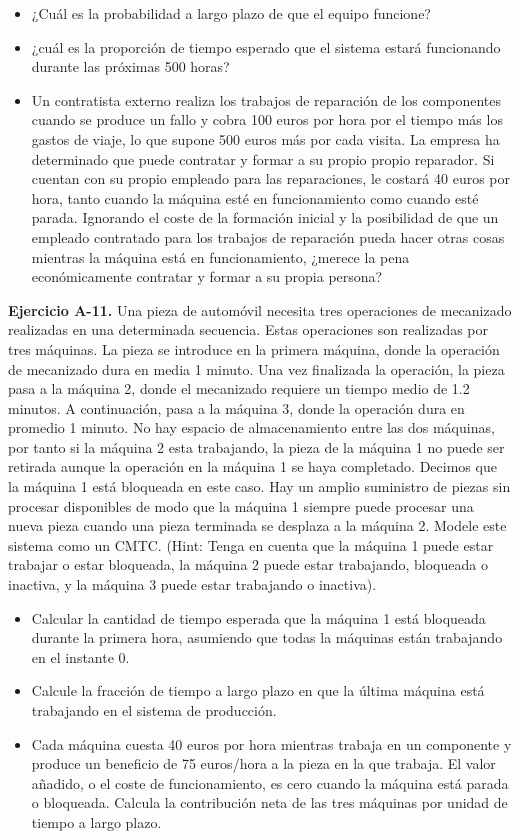\documentclass[
]{book}
\providecommand{\tightlist}{%
  \setlength{\itemsep}{0pt}\setlength{\parskip}{0pt}}
\theoremstyle{definition}
\theoremstyle{definition}
\theoremstyle{definition}
\theoremstyle{definition}
\theoremstyle{remark}
\begin{document}
\begin{itemize}
\tightlist
\item
  ¿Cuál es la probabilidad a largo plazo de que el equipo funcione?
\item
  ¿cuál es la proporción de tiempo esperado que el sistema estará funcionando durante las próximas 500 horas?
\item
  Un contratista externo realiza los trabajos de reparación de los componentes cuando se produce un fallo y cobra 100 euros por hora por el tiempo más los gastos de viaje, lo que supone 500 euros más por cada visita. La empresa ha determinado que puede contratar y formar a su propio propio reparador. Si cuentan con su propio empleado para las reparaciones, le costará 40 euros por hora, tanto cuando la máquina esté en funcionamiento como cuando esté parada. Ignorando el coste de la formación inicial y la posibilidad de que un empleado contratado
  para los trabajos de reparación pueda hacer otras cosas mientras la máquina está en funcionamiento, ¿merece la pena económicamente contratar y formar a su propia persona?
\end{itemize}

\textbf{Ejercicio A-11.} Una pieza de automóvil necesita tres operaciones de mecanizado realizadas en una determinada
secuencia. Estas operaciones son realizadas por tres máquinas. La pieza se introduce en la primera máquina, donde la operación de mecanizado dura en media 1 minuto. Una vez finalizada la operación, la pieza pasa a la máquina 2, donde el mecanizado requiere un tiempo medio de 1.2 minutos. A continuación, pasa a la máquina 3, donde la operación dura en promedio 1 minuto. No hay espacio de almacenamiento entre las dos máquinas, por tanto si la máquina 2 esta trabajando, la pieza de la máquina 1 no puede ser retirada aunque la operación en la máquina 1 se haya completado. Decimos que la máquina 1 está bloqueada en este caso. Hay un amplio suministro de piezas sin procesar disponibles de modo que la máquina 1 siempre puede procesar una nueva pieza cuando una pieza terminada se desplaza a la máquina 2. Modele este sistema como un CMTC. (Hint: Tenga en cuenta que la máquina 1 puede estar
trabajar o estar bloqueada, la máquina 2 puede estar trabajando, bloqueada o inactiva, y la máquina 3 puede estar trabajando o inactiva).

\begin{itemize}
\tightlist
\item
  Calcular la cantidad de tiempo esperada que la máquina 1 está bloqueada durante la primera hora, asumiendo que todas la máquinas están trabajando en el instante 0.
\item
  Calcule la fracción de tiempo a largo plazo en que la última máquina está trabajando en el sistema de producción.
\item
  Cada máquina cuesta 40 euros por hora mientras trabaja en un componente y produce un beneficio de 75 euros/hora a la pieza en la que trabaja. El valor añadido, o el coste de funcionamiento, es cero cuando la máquina está parada o bloqueada. Calcula la contribución neta de las tres máquinas por unidad de tiempo a largo plazo.
\end{itemize}
\end{document}
